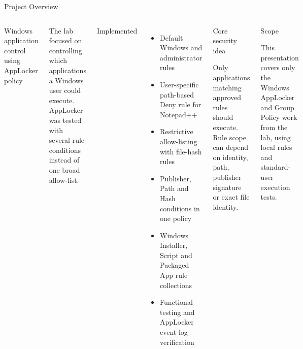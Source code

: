 \documentclass[aspectratio=169,10pt]{beamer}
\newcommand{\boxtext}[4][SoftGrey]{%
	\begingroup
	\setlength{\fboxsep}{7pt}%
	\colorbox{#1}{%
		\parbox{\dimexpr\linewidth-2\fboxsep\relax}{%
\RaggedRight
			{\color{#2}\large #3}
			\par
			\vspace{0.07cm}
			{\small #4}%
		}%
	}%
	\endgroup
}
\newcommand{\sectionlabel}[1]{%
	{\color{PortfolioTeal}\large #1}
}
\begin{document}
	\begin{frame}{Project Overview}
		
		\begin{columns}[T,onlytextwidth]
			
			
			{\large
				Windows application control using AppLocker policy
			}
			\par
			
			\vspace{0.12cm}
			
			\small
			
			The lab focused on controlling which applications a Windows
			user could execute. AppLocker was tested with several rule
			conditions instead of one broad allow-list.
			
			\vspace{0.22cm}
			
			\sectionlabel{Implemented}
			
			\begin{itemize}
				\small
				\setlength\itemsep{0.06cm}
				
				\item Default Windows and administrator rules
				
				\item User-specific path-based Deny rule for Notepad++
				
				\item Restrictive allow-listing with file-hash rules
				
				\item Publisher, Path and Hash conditions in one policy
				
				\item Windows Installer, Script and Packaged App
				rule collections
				
				\item Functional testing and AppLocker
				event-log verification
				
			\end{itemize}
			
			
			\boxtext[SoftTeal]
			{PortfolioTeal}
			{Core security idea}
			{
				Only applications matching approved rules should execute.
				Rule scope can depend on identity, path, publisher signature
				or exact file identity.
			}
			
			\vspace{0.17cm}
			
			\boxtext[SoftOrange]
			{PortfolioOrange}
			{Scope}
			{
				This presentation covers only the Windows AppLocker and
				Group Policy work from the lab, using local rules and standard-user execution tests.
			}
			
		\end{columns}
		
	\end{frame}
	
\end{document}
